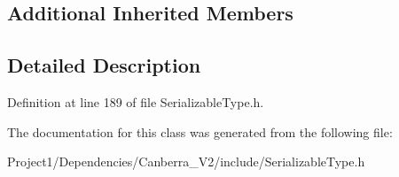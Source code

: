 \subsection*{Additional Inherited Members}


\subsection{Detailed Description}


Definition at line 189 of file Serializable\+Type.\+h.



The documentation for this class was generated from the following file\+:\begin{DoxyCompactItemize}
\item 
Project1/\+Dependencies/\+Canberra\+\_\+\+V2/include/Serializable\+Type.\+h\end{DoxyCompactItemize}
